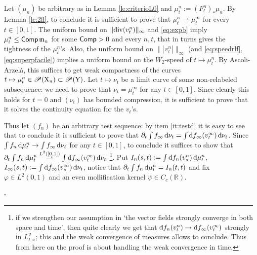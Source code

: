 \documentclass[11pt]{article}
\numberwithin{equation}{section}
\newenvironment{idea}{\removelastskip\par\medskip   %
\noindent{\em Idea of the proof} \rm}{\penalty-20\null\hfill$\square$\par\medbreak}
\newcommand{\R}{\mathbb{R}}
\newcommand{\pr}{\mathscr P}
\newcommand{\X}{{\rm X}}
\newcommand{\Y}{{\rm Y}}
\newcommand{\mm}{{\mathfrak m}}
\renewcommand{\d}{{\rm d}}
\renewcommand{\div}{{\rm div}}
\newcommand{\weakto}{\rightharpoonup}
\newcommand{\Comp}{{\sf Comp}}
\begin{document}
\begin{idea}
Let $(\mu_n)$ be arbitrary as in Lemma \ref{le:criterioL0} and $\mu^n_t:=(F^n_t)_*\mu_n$. By Lemma \ref{le:2fl}, to conclude it is sufficient to prove that $\mu^n_t\weakto\mu^\infty_t$ for every $t\in[0,1]$. The uniform bound on $\|\div(v^n_t)\|_\infty$ and \eqref{eq:expb} imply $\mu^n_t\leq \Comp\,\mm_n$ for some $\Comp>0$ and every $n,t$, that in turns gives the tightness of the $\mu^n_t$'s. Also, the uniform bound on $\||v^n_t|\|_\infty$  (and \eqref{eq:speedrlf}, \eqref{eq:superpfacile}) implies a uniform bound on the $W_2$-speed of $t\mapsto\mu^n_t$. By Ascoli-Arzel\`a, this suffices to get weak compactness    of the curves $t\mapsto \mu^n_t\in \pr(\X_n) \subset \pr(\Y)$. Let $t\mapsto\nu_t$ be a limit curve of some non-relabeled subsequence: we need to prove that $\nu_t=\mu_t^\infty$ for any $t\in[0,1]$. Since clearly this holds for $t=0$ and $(\nu_t)$ has bounded compression, it is sufficient to prove that it solves the continuity equation for the $v_t$'s.

Thus let  $(f_n)$ be an arbitrary test sequence: by item \ref{it:testd} it is easy to see that to conclude it is sufficient to prove that $\partial_t\int f_\infty\,\d\nu_t=\int\d f_\infty(v^\infty_t)\,\d\nu_t$. Since  $\int f_n\,\d\mu^n_t\to\int f_\infty\,\d\nu_t$ for any  $t\in[0,1]$, to conclude it suffices  to show that $\partial_t\int f_n\,\d\mu^n_t\stackrel{L^2([0,1])}{\weakto}\int \d f_\infty(v^\infty_t)\,\d\nu_t$  \footnote{if we strengthen our assumption in `the vector fields strongly converge in both space and time', then quite clearly we get that $\d f_n(v_t^n)\stackrel{}\to \d f_\infty(v_t^\infty)$ strongly in $L^2_{t,x}$; this  and  the weak convergence of measures allows to conclude. Thus from here on the proof is about handling the weak convergence in time.}. Put $I_n(s,t):=\int \d f_n(v^n_s)\,\d\mu^n_t$, $I_\infty(s,t):=\int \d f_\infty(v^\infty_s)\,\d\nu_t$, notice that $\partial_t\int f_n\,\d\mu^n_t=I_n(t,t)$  and fix $\varphi\in L^2(0,1)$ and an even mollification kernel  $\psi\in   C_c(\R)$.


\end{idea}
\end{document}
